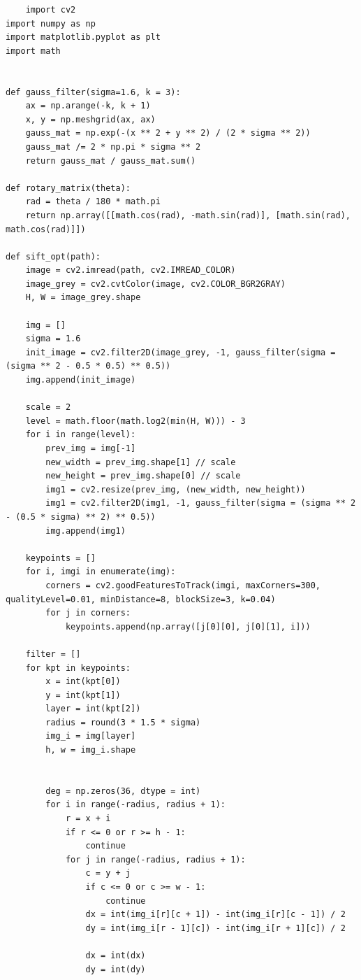 \documentclass{article}
\begin{document}
\begin{lstlisting}
    import cv2
import numpy as np
import matplotlib.pyplot as plt
import math


def gauss_filter(sigma=1.6, k = 3):
    ax = np.arange(-k, k + 1)
    x, y = np.meshgrid(ax, ax)
    gauss_mat = np.exp(-(x ** 2 + y ** 2) / (2 * sigma ** 2))
    gauss_mat /= 2 * np.pi * sigma ** 2
    return gauss_mat / gauss_mat.sum()

def rotary_matrix(theta):
    rad = theta / 180 * math.pi
    return np.array([[math.cos(rad), -math.sin(rad)], [math.sin(rad), math.cos(rad)]])

def sift_opt(path):
    image = cv2.imread(path, cv2.IMREAD_COLOR)
    image_grey = cv2.cvtColor(image, cv2.COLOR_BGR2GRAY)
    H, W = image_grey.shape

    img = []
    sigma = 1.6
    init_image = cv2.filter2D(image_grey, -1, gauss_filter(sigma = (sigma ** 2 - 0.5 * 0.5) ** 0.5))
    img.append(init_image)

    scale = 2
    level = math.floor(math.log2(min(H, W))) - 3
    for i in range(level):
        prev_img = img[-1]
        new_width = prev_img.shape[1] // scale
        new_height = prev_img.shape[0] // scale
        img1 = cv2.resize(prev_img, (new_width, new_height))
        img1 = cv2.filter2D(img1, -1, gauss_filter(sigma = (sigma ** 2 - (0.5 * sigma) ** 2) ** 0.5))
        img.append(img1)

    keypoints = []
    for i, imgi in enumerate(img):
        corners = cv2.goodFeaturesToTrack(imgi, maxCorners=300, qualityLevel=0.01, minDistance=8, blockSize=3, k=0.04)
        for j in corners:
            keypoints.append(np.array([j[0][0], j[0][1], i]))

    filter = []
    for kpt in keypoints:
        x = int(kpt[0])
        y = int(kpt[1])
        layer = int(kpt[2])
        radius = round(3 * 1.5 * sigma)
        img_i = img[layer]
        h, w = img_i.shape


        deg = np.zeros(36, dtype = int)
        for i in range(-radius, radius + 1):
            r = x + i
            if r <= 0 or r >= h - 1:
                continue
            for j in range(-radius, radius + 1):
                c = y + j
                if c <= 0 or c >= w - 1:
                    continue
                dx = int(img_i[r][c + 1]) - int(img_i[r][c - 1]) / 2
                dy = int(img_i[r - 1][c]) - int(img_i[r + 1][c]) / 2

                dx = int(dx)
                dy = int(dy)


\end{lstlisting}
\end{document}
